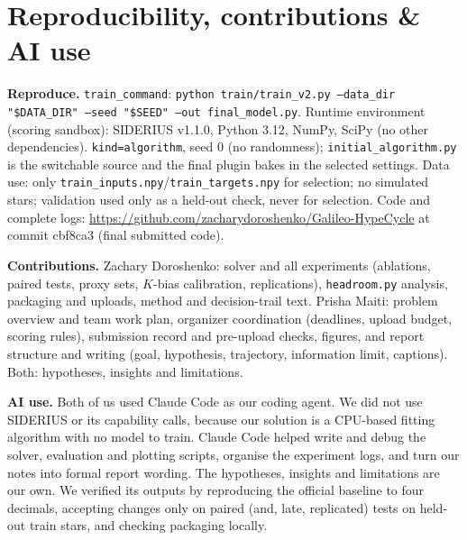 \documentclass{article}
\begin{document}
\section{Reproducibility, contributions \& AI use}
\textbf{Reproduce.} \texttt{train\_command}:
\texttt{python train/train\_v2.py --data\_dir "\$DATA\_DIR" --seed "\$SEED" --out final\_model.py}.
Runtime environment (scoring sandbox): SIDERIUS v1.1.0, Python 3.12, NumPy, SciPy (no other
dependencies). \texttt{kind=algorithm}, seed 0 (no randomness);
\texttt{initial\_algorithm.py} is the switchable source and the final
plugin bakes in the selected settings. Data use: only
\texttt{train\_inputs.npy}/\texttt{train\_targets.npy} for selection; no
simulated stars; validation used only as a held-out check, never for selection. Code and complete logs:
\url{https://github.com/zacharydoroshenko/Galileo-HypeCycle} at commit cbf8ca3 (final submitted code).

\textbf{Contributions.} Zachary Doroshenko: solver and all experiments
(ablations, paired tests, proxy sets, $K$-bias calibration, replications),
\texttt{headroom.py} analysis, packaging and uploads, method and
decision-trail text.
Prisha Maiti: problem overview and team work plan, organizer coordination
(deadlines, upload budget, scoring rules), submission record and
pre-upload checks, figures, and report structure and writing (goal,
hypothesis, trajectory, information limit, captions). Both: hypotheses,
insights and limitations.

\textbf{AI use.} Both of us used Claude Code as our coding agent. We did
not use SIDERIUS or its capability calls, because our solution is a
CPU-based fitting algorithm with no model to train. Claude Code helped
write and debug the solver, evaluation and plotting scripts, organise the
experiment logs, and turn our notes into formal report wording. The
hypotheses, insights and limitations are our own. We verified its outputs
by reproducing the official baseline to four decimals, accepting changes
only on paired (and, late, replicated) tests on held-out train stars, and
checking packaging locally.
\end{document}
